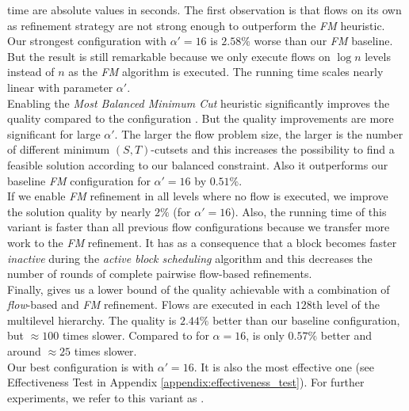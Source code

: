 time are absolute values in seconds. The first observation is that flows on
its own as refinement strategy are not strong enough to outperform the
\emph{FM} heuristic. Our strongest configuration with $\alpha' = 16$
is $2.58\%$ worse than our \emph{FM} baseline. But the result 
is still remarkable because we only execute flows on $\log{n}$ levels
instead of $n$ as the \emph{FM} algorithm is executed. The running time
scales nearly linear with parameter $\alpha'$. \\
Enabling the \emph{Most Balanced Minimum Cut} heuristic significantly improves the
quality compared to the configuration \FlowVariant{+}{-}{-}.
But the quality improvements are more significant for large
$\alpha'$. The larger the flow problem size, the larger is the number of different minimum 
$(S,T)$-cutsets and this increases the possibility to find a feasible solution according to 
our balanced constraint. Also it outperforms our baseline \emph{FM} 
configuration for $\alpha' = 16$ by $0.51\%$.\\
If we enable \emph{FM} refinement in all levels where no flow is executed, we improve the solution
quality by nearly $2\%$ (for $\alpha' = 16$). Also, the running time of this variant is faster
than all previous flow configurations because we transfer more work to the \emph{FM} refinement.
It has as a consequence that a block becomes faster \emph{inactive} during the \emph{active block 
scheduling} algorithm and this decreases the number of rounds of complete pairwise 
flow-based refinements. \\
Finally,  gives us a lower bound of the quality
achievable with a combination of \emph{flow}-based and \emph{FM} refinement. Flows are executed 
in each $128$th level of the multilevel hierarchy. The quality is $2.44\%$ better than our
baseline configuration, but $\approx 100$ times slower. Compared to \FlowVariant{+}{+}{+} for 
$\alpha = 16$,  is only $0.57\%$ better and around $\approx 25$ times slower.\\
Our best configuration is \FlowVariant{+}{+}{+} with $\alpha' = 16$. It is also the most 
effective one (see Effectiveness Test in Appendix \ref{appendix:effectiveness_test}). For
further experiments, we refer to this variant as .

